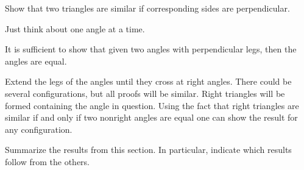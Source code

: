 \documentclass[newpage,hints,handout]{ximera}
\begin{document}
\begin{problem}
Show that two triangles are similar if corresponding sides are perpendicular.
\begin{hint}
Just think about one angle at a time.
\end{hint}
\begin{freeResponse}
It is sufficient to show that given two angles with perpendicular
legs, then the angles are equal.

Extend the legs of the angles until they cross at right angles. There
could be several configurations, but all proofs will be similar. Right
triangles will be formed containing the angle in question. Using the
fact that right triangles are similar if and only if two nonright
angles are equal one can show the result for any configuration. 
\end{freeResponse}
\end{problem}


\begin{problem}
Summarize the results from this section. In particular, indicate which
results follow from the others.
\begin{freeResponse}
\end{freeResponse}
\end{problem}
\end{document}
